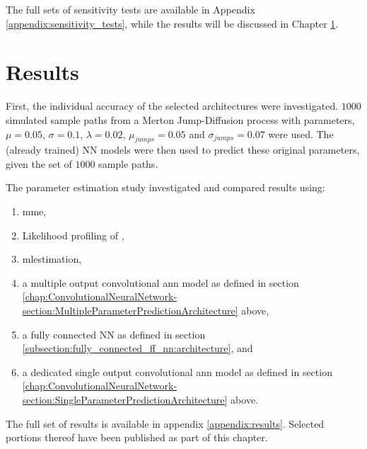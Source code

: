 \documentclass[11pt,oneside,openany,a4paper,english, report, goldenblock
]{usthesis}
\begin{document}
The full sets of sensitivity tests are available in Appendix \ref{appendix:sensitivity_tests}, while the results will be discussed in Chapter \ref{chapter:results}.

\chapter{Results}
\label{chapter:results}

First, the individual accuracy of the selected architectures were investigated. $1000$ simulated sample paths from a Merton Jump-Diffusion process with parameters, $\mu = 0.05$, $\sigma = 0.1$, $\lambda = 0.02$, $\mu_{jumps} = 0.05$ and $\sigma_{jumps} = 0.07$ were used. The (already trained) NN models were then used to predict these original parameters, given the set of $1000$ sample paths. 

The parameter estimation study investigated and compared results using: 
\begin{enumerate}[-]
	\itemsep0em 
	\item  \acrshort{mme},
	\item  Likelihood profiling of \citet{Honore},
	\item  \acrshort{mlestimation},
	\item a multiple output convolutional \acrshort{ann} model as defined in section \ref{chap:ConvolutionalNeuralNetwork-section:MultipleParameterPredictionArchitecture} above,
	\item a fully connected NN as defined in section \ref{subsection:fully_connected_ff_nn:architecture}, and
	\item a dedicated single output convolutional \acrshort{ann} model as defined in section \ref{chap:ConvolutionalNeuralNetwork-section:SingleParameterPredictionArchitecture} above.
\end{enumerate}
The full set of results is available in appendix \ref{appendix:results}. Selected portions thereof have been published as part of this chapter.
\end{document}

